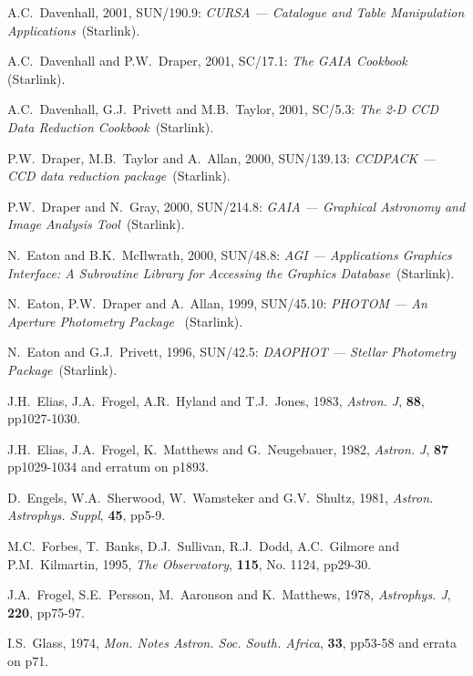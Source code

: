\documentclass[twoside,11pt]{article}
\newcommand{\xref}[3]{#1}
\begin{document}
\begin{thebibliography}{99}
   A.C.~Davenhall, 2001, \xref{SUN/190.9}{sun190}{}:
   {\it CURSA --- Catalogue and Table Manipulation Applications}\,
   (Starlink).

   A.C.~Davenhall and P.W.~Draper, 2001,
   \xref{SC/17.1}{sc17}{}: {\it The GAIA Cookbook}\, (Starlink).

   A.C.~Davenhall, G.J.~Privett and M.B.~Taylor, 2001, 
   \xref{SC/5.3}{sc5}{}: {\it The 2-D CCD Data Reduction Cookbook}\,
   (Starlink).

   P.W.~Draper, M.B.~Taylor and A.~Allan, 2000,
   \xref{SUN/139.13}{sun139}{}: {\it CCDPACK --- CCD data reduction package}\,
   (Starlink).

   P.W.~Draper and N.~Gray, 2000,
   \xref{SUN/214.8}{sun214}{}: {\it GAIA --- Graphical Astronomy and Image
   Analysis Tool}\, (Starlink).

   N.~Eaton and B.K.~McIlwrath, 2000,
   \xref{SUN/48.8}{sun48}{}: {\it AGI --- Applications Graphics Interface:
   A Subroutine Library for Accessing the Graphics Database}\, (Starlink).

   N.~Eaton, P.W.~Draper and A.~Allan, 1999,
   \xref{SUN/45.10}{sun45}{}: {\it PHOTOM --- An Aperture Photometry
   Package }\, (Starlink).

   N.~Eaton and G.J.~Privett, 1996, \xref{SUN/42.5}{sun42}{}:
   {\it DAOPHOT --- Stellar Photometry Package}\, (Starlink).

   J.H.~Elias, J.A.~Frogel, A.R.~Hyland and T.J.~Jones,
   1983, {\it Astron. J}, {\bf 88}, pp1027-1030.

   J.H.~Elias, J.A.~Frogel, K.~Matthews and G.~Neugebauer,
   1982, {\it Astron. J}, {\bf 87} pp1029-1034 and erratum on p1893.

   D.~Engels, W.A.~Sherwood, W.~Wamsteker and
   G.V.~Shultz, 1981, {\it Astron. Astrophys. Suppl}, {\bf 45}, pp5-9.

   M.C.~Forbes, T.~Banks, D.J.~Sullivan, R.J.~Dodd,
   A.C.~Gilmore and P.M.~Kilmartin, 1995, {\it The Observatory},
   {\bf 115}, No. 1124, pp29-30.

   J.A.~Frogel, S.E.~Persson, M.~Aaronson and
   K.~Matthews, 1978, {\it Astrophys. J}, {\bf 220}, pp75-97.

   I.S.~Glass, 1974, {\it Mon. Notes Astron. Soc.
   South. Africa}, {\bf 33}, pp53-58 and errata on p71.


\end{thebibliography}
\end{document}

